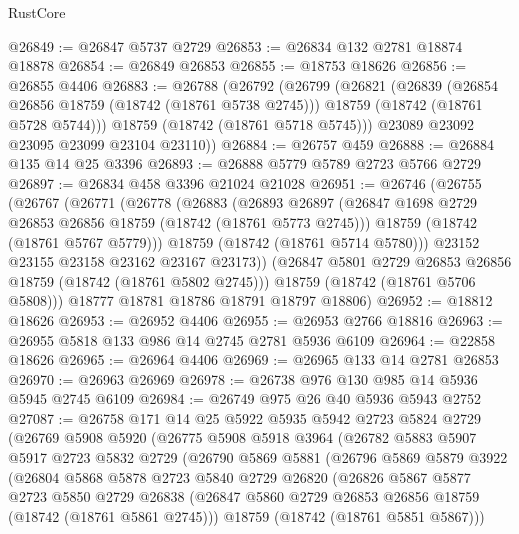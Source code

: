 \begin{lexlean}{RustCore}
\begin{coremodule}
@26849 := @26847 @5737 @2729
@26853 := @26834 @132 @2781 @18874 @18878
@26854 := @26849 @26853
@26855 := @18753 @18626
@26856 := @26855 @4406
@26883 := @26788
    (@26792
      (@26799
        (@26821
          (@26839
            (@26854 @26856 @18759 (@18742 (@18761 @5738 @2745)))
            @18759
            (@18742 (@18761 @5728 @5744)))
          @18759
          (@18742 (@18761 @5718 @5745)))
        @23089
        @23092
        @23095
        @23099
        @23104
        @23110))
@26884 := @26757 @459
@26888 := @26884 @135 @14 @25 @3396
@26893 := @26888 @5779 @5789 @2723 @5766 @2729
@26897 := @26834 @458 @3396 @21024 @21028
@26951 := @26746
    (@26755
      (@26767
        (@26771
          (@26778
            (@26883
              (@26893
                @26897
                (@26847 @1698 @2729 @26853 @26856 @18759 (@18742 (@18761 @5773 @2745)))
                @18759
                (@18742 (@18761 @5767 @5779)))
              @18759
              (@18742 (@18761 @5714 @5780)))
            @23152
            @23155
            @23158
            @23162
            @23167
            @23173))
        (@26847 @5801 @2729 @26853 @26856 @18759 (@18742 (@18761 @5802 @2745)))
        @18759
        (@18742 (@18761 @5706 @5808)))
      @18777
      @18781
      @18786
      @18791
      @18797
      @18806)
@26952 := @18812 @18626
@26953 := @26952 @4406
@26955 := @26953 @2766 @18816
@26963 := @26955 @5818 @133 @986 @14 @2745 @2781 @5936 @6109
@26964 := @22858 @18626
@26965 := @26964 @4406
@26969 := @26965 @133 @14 @2781 @26853
@26970 := @26963 @26969
@26978 := @26738 @976 @130 @985 @14 @5936 @5945 @2745 @6109
@26984 := @26749 @975 @26 @40 @5936 @5943 @2752
@27087 := @26758
    @171
    @14
    @25
    @5922
    @5935
    @5942
    @2723
    @5824
    @2729
    (@26769
      @5908
      @5920
      (@26775
        @5908
        @5918
        @3964
        (@26782
          @5883
          @5907
          @5917
          @2723
          @5832
          @2729
          (@26790
            @5869
            @5881
            (@26796
              @5869
              @5879
              @3922
              (@26804
                @5868
                @5878
                @2723
                @5840
                @2729
                @26820
                (@26826
                  @5867
                  @5877
                  @2723
                  @5850
                  @2729
                  @26838
                  (@26847 @5860 @2729 @26853 @26856 @18759 (@18742 (@18761 @5861 @2745)))
                  @18759
                  (@18742 (@18761 @5851 @5867)))

\end{coremodule}
\end{lexlean}
